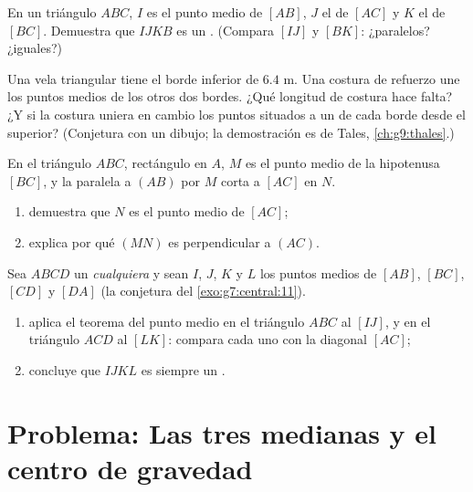 \begin{exercise}[$\star\star$]\label{exo:g8:midpoints:6}
En un triángulo $ABC$, $I$ es el punto medio de $[AB]$, $J$ el de
$[AC]$ y $K$ el de $[BC]$. Demuestra que $IJKB$ es un .
(Compara $[IJ]$ y $[BK]$: ¿paralelos? ¿iguales?)
\end{exercise}

\begin{exercise}[$\star\star$]\label{exo:g8:midpoints:7}
Una vela triangular tiene el borde inferior de $6.4$ m. Una costura de refuerzo
une los puntos medios de los otros dos bordes. ¿Qué longitud de costura
hace falta? ¿Y si la costura uniera en cambio los puntos situados a un
 de cada borde desde el  superior? (Conjetura con
un dibujo; la demostración es de Tales, \cref{ch:g9:thales}.)
\end{exercise}

\begin{exercise}[$\star\star$]\label{exo:g8:midpoints:8}
En el triángulo $ABC$, rectángulo en $A$, $M$ es el punto medio de la
hipotenusa $[BC]$, y la paralela a $(AB)$ por $M$ corta a
$[AC]$ en $N$.
\begin{enumerate}
  \item demuestra que $N$ es el punto medio de $[AC]$;
  \item explica por qué $(MN)$ es perpendicular a $(AC)$.
\end{enumerate}
\end{exercise}

\begin{exercise}[$\star\star\star$]\label{exo:g8:midpoints:9}
Sea $ABCD$ un  \emph{cualquiera} y sean $I$, $J$, $K$ y $L$ los
puntos medios de $[AB]$, $[BC]$, $[CD]$ y $[DA]$ (la conjetura del
\cref{exo:g7:central:11}).
\begin{enumerate}
  \item aplica el teorema del punto medio en el triángulo $ABC$ al
         $[IJ]$, y en el triángulo $ACD$ al 
        $[LK]$: compara cada uno con la diagonal $[AC]$;
  \item concluye que $IJKL$ es siempre un .
\end{enumerate}
\end{exercise}

\section{Problema: Las tres medianas y el centro de gravedad}

